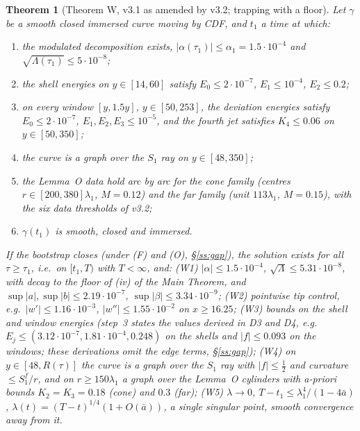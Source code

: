 \documentclass[11pt]{amsart}
\newtheorem{theorem}{Theorem}[section]
\theoremstyle{definition}
\theoremstyle{remark}
\newcommand{\Lam}{\Lambda}
\begin{document}
\begin{theorem}[Theorem W, v3.1 as amended by v3.2; trapping with a floor]\label{thm:W}
Let $\gamma$ be a smooth closed immersed curve moving by CDF, and $t_1$ a time at which:
\begin{enumerate}[label=\textup{(H\arabic*)},leftmargin=*,itemsep=1pt]
\item the modulated decomposition exists, $|\alpha(\tau_1)|\le\alpha_1=1.5\cdot10^{-4}$ and $\sqrt{\Lam(\tau_1)}\le5\cdot10^{-8}$;
\item the shell energies on $y\in[14,60]$ satisfy $E_0\le2\cdot10^{-7}$, $E_1\le10^{-4}$, $E_2\le0.2$;
\item on every window $[y,1.5y]$, $y\in[50,253]$, the deviation energies satisfy $E_0\le2\cdot10^{-7}$, $E_1,E_2,E_3\le10^{-5}$, and the fourth jet satisfies $K_4\le0.06$ on $y\in[50,350]$;
\item the curve is a graph over the $S_1$ ray on $y\in[48,350]$;
\item the Lemma~O data hold arc by arc for the cone family (centres $r\in[200,380]\lambda_1$, $M=0.12$) and the far family (unit $113\lambda_1$, $M=0.15$), with the six data thresholds of v3.2;
\item $\gamma(t_1)$ is smooth, closed and immersed.
\end{enumerate}
If the bootstrap closes (under (F) and (O), \S\ref{ss:gap}), the solution exists for all $\tau\ge\tau_1$, i.e.\ on $[t_1,T)$ with $T<\infty$, and: \textup{(W1)} $|\alpha|\le1.5\cdot10^{-4}$, $\sqrt\Lam\le5.31\cdot10^{-8}$, with decay to the floor of (iv) of the Main Theorem, and $\sup|a|,\sup|b|\le2.19\cdot10^{-7}$, $\sup|\beta|\le3.34\cdot10^{-9}$; \textup{(W2)} pointwise tip control, e.g.\ $|w'|\le1.16\cdot10^{-3}$, $|w''|\le1.55\cdot10^{-2}$ on $x\ge16.25$; \textup{(W3)} bounds on the shell and window energies (step~3 states the values derived in D3 and D4, e.g.\ $E_j\le(3.12\cdot10^{-7},1.81\cdot10^{-4},0.248)$ on the shells and $|f|\le0.093$ on the windows; these derivations omit the edge terms, \S\ref{ss:gap}); \textup{(W4)} on $y\in[48,R(\tau)]$ the curve is a graph over the $S_1$ ray with $|f|\le\frac12$ and curvature $\le S_1^f/r$, and on $r\ge150\lambda_1$ a graph over the Lemma~O cylinders with a-priori bounds $K_2=K_3=0.18$ (cone) and $0.3$ (far); \textup{(W5)} $\lambda\to0$, $T-t_1\le\lambda_1^4/(1-4\bar a)$, $\lambda(t)=(T-t)^{1/4}(1+O(\bar a))$, a single singular point, smooth convergence away from it.
\end{theorem}
\end{document}
